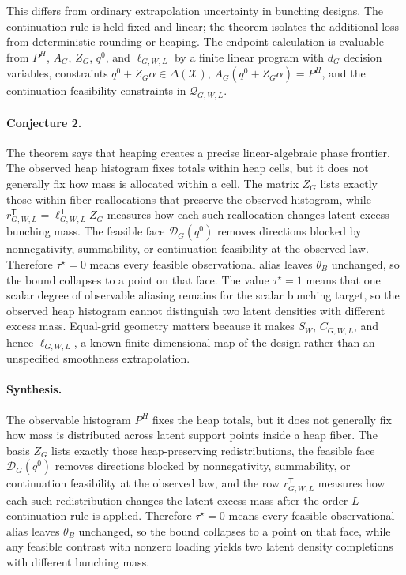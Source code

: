 \documentclass[11pt]{article}
\newcommand{\transpose}{\mathsf{T}}
\theoremstyle{definition}
\theoremstyle{plain}
\theoremstyle{remark}
\begin{document}
This differs from ordinary extrapolation uncertainty in bunching designs.  The continuation rule is held fixed and linear; the theorem isolates the additional loss from deterministic rounding or heaping.  The endpoint calculation is evaluable from \(P^H\), \(A_G\), \(Z_G\), \(q^0\), and \(\ell_{G,W,L}\) by a finite linear program with \(d_G\) decision variables, constraints \(q^0+Z_G\alpha\in\Delta(\mathcal{X})\), \(A_G(q^0+Z_G\alpha)=P^H\), and the continuation-feasibility constraints in \(\mathcal{Q}_{G,W,L}\).

\paragraph{Conjecture 2.}
The theorem says that heaping creates a precise linear-algebraic phase frontier.  The observed heap histogram fixes totals within heap cells, but it does not generally fix how mass is allocated within a cell.  The matrix \(Z_G\) lists exactly those within-fiber reallocations that preserve the observed histogram, while \(r_{G,W,L}^{\transpose}=\ell_{G,W,L}^{\transpose}Z_G\) measures how each such reallocation changes latent excess bunching mass.  The feasible face \(\mathcal{D}_G(q^0)\) removes directions blocked by nonnegativity, summability, or continuation feasibility at the observed law.  Therefore \(\tau^\star=0\) means every feasible observational alias leaves \(\theta_B\) unchanged, so the bound collapses to a point on that face.  The value \(\tau^\star=1\) means that one scalar degree of observable aliasing remains for the scalar bunching target, so the observed heap histogram cannot distinguish two latent densities with different excess mass.  Equal-grid geometry matters because it makes \(S_W\), \(C_{G,W,L}\), and hence \(\ell_{G,W,L}\), a known finite-dimensional map of the design rather than an unspecified smoothness extrapolation.

\paragraph{Synthesis.}
The observable histogram \(P^H\) fixes the heap totals, but it does not generally fix how mass is distributed across latent support points inside a heap fiber.  The basis \(Z_G\) lists exactly those heap-preserving redistributions, the feasible face \(\mathcal{D}_G(q^0)\) removes directions blocked by nonnegativity, summability, or continuation feasibility at the observed law, and the row \(r_{G,W,L}^{\transpose}\) measures how each such redistribution changes the latent excess mass after the order-\(L\) continuation rule is applied.  Therefore \(\tau^\star=0\) means every feasible observational alias leaves \(\theta_B\) unchanged, so the bound collapses to a point on that face, while any feasible contrast with nonzero loading yields two latent density completions with different bunching mass.
\end{document}

